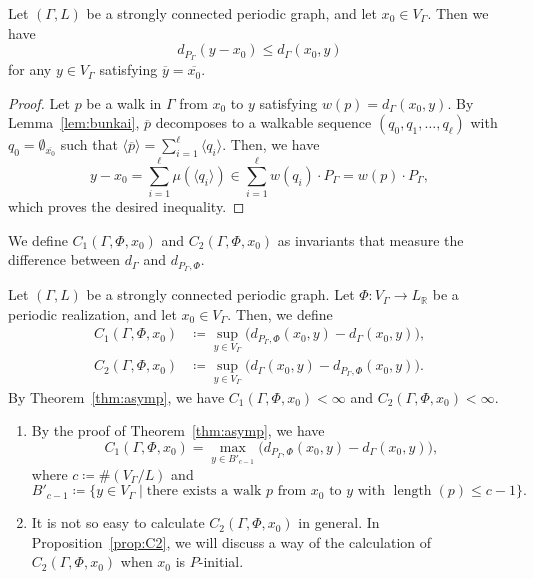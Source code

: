 \documentclass[ALCO,published]{cedram}
\theoremstyle{remark}
\begin{document}
\begin{lem}\label{lem:dPd}
Let $(\Gamma , L)$ be a strongly connected periodic graph, and let $x_0 \in V_{\Gamma}$. 
Then we have 
\[
d_{P_{\Gamma}}(y - x_0) \le d_{\Gamma}(x_0, y)
\]
for any $y \in V_{\Gamma}$ satisfying $\overline{y} = \overline{x_0}$. 
\end{lem}
\begin{proof}
Let $p$ be a walk in $\Gamma$ from $x_0$ to $y$ satisfying $w(p) = d_{\Gamma}(x_0, y)$. 
By Lemma~\ref{lem:bunkai}, $\overline{p}$ decomposes to a walkable sequence $(q_0, q_1, \ldots , q_{\ell})$ with $q_0 = \emptyset _{\overline{x_0}}$ such that 
$\langle \overline{p} \rangle = \sum _{i = 1} ^{\ell} \langle q_i \rangle$. 
Then, we have 
\[
y-x_0 
= \sum _{i=1} ^{\ell} \mu(\langle q_i \rangle) 
\in \sum _{i = 1} ^{\ell} w(q_i) \cdot P_{\Gamma} 
= w(p) \cdot P_{\Gamma}, 
\]
which proves the desired inequality. 
\end{proof}

We define $C_{1}(\Gamma, \Phi, x_0)$ and $C_{2}(\Gamma, \Phi, x_0)$ as invariants that measure the difference between $d_{\Gamma}$ and $d_{P_{\Gamma}, \Phi}$. 

\begin{defi}
Let $(\Gamma , L)$ be a strongly connected periodic graph. 
Let $\Phi : V_{\Gamma} \to L_{\mathbb{R}}$ be a periodic realization, and let $x_0 \in V_{\Gamma}$. 
Then, we define 
\begin{align*}
C_{1}(\Gamma, \Phi, x_0) &\coloneqq  \sup _{y \in V_{\Gamma}} \bigl( d_{P_{\Gamma}, \Phi} (x_0, y) - d_{\Gamma} (x_0, y) \bigr), \\
C_{2}(\Gamma, \Phi, x_0) &\coloneqq  \sup _{y \in V_{\Gamma}} \bigl( d_{\Gamma}(x_0, y) - d_{P_{\Gamma}, \Phi} ( x_0, y ) \bigr). 
\end{align*}
By Theorem~\ref{thm:asymp}, we have $C_{1}(\Gamma, \Phi, x_0) < \infty$ and $C_{2}(\Gamma, \Phi, x_0) < \infty$. 
\end{defi}

\begin{rmk}\label{rmk:C1}
\begin{enumerate}
\item
By the proof of Theorem~\ref{thm:asymp}, we have 
\[
C_{1}(\Gamma, \Phi, x_0) = 
\max _{y \in B'_{c-1}} \bigl( d_{P_{\Gamma}, \Phi} (x_0, y) - d_{\Gamma} (x_0, y) \bigr), 
\]
where $c \coloneqq  \# (V_{\Gamma} /L)$ and 
\[
B'_{c-1} \coloneqq  \{ y \in V_{\Gamma} \mid \text{there exists a walk $p$ from $x_0$ to $y$ with $\operatorname{length}(p) \le c-1$}\}. 
\]

\item
It is not so easy to calculate $C_2(\Gamma, \Phi, x_0)$ in general. 
In Proposition~\ref{prop:C2}, we will discuss a way of the calculation of $C_2(\Gamma, \Phi, x_0)$ when $x_0$ is $P$-initial. 
\end{enumerate}
\end{rmk}
\end{document}
